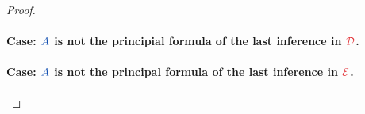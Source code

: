 \begin{proof}
  \paragraph{Case: $\prp{A}$ is not the principial formula of the last
  inference in $\drv{D}$.}\quad

  \paragraph{Case: $\prp{A}$ is not the principal formula of the last
  inference in $\drv{E}$.}\quad

\end{proof}




